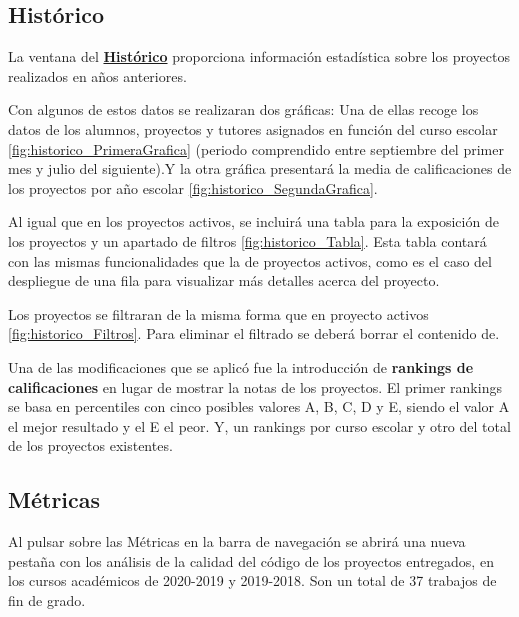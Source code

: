 \subsection{Histórico} 
La ventana del \textbf{\href{https://gestor-tfg-2021.herokuapp.com/Historic}{Histórico}} proporciona información estadística sobre los proyectos realizados en años anteriores. 

Con algunos de estos datos se realizaran dos gráficas: Una de ellas recoge los datos de los alumnos, proyectos y tutores asignados en función del curso escolar \ref{fig:historico_PrimeraGrafica} (periodo comprendido entre septiembre del primer mes y julio del siguiente).Y la otra gráfica presentará la media de calificaciones de los proyectos por año escolar \ref{fig:historico_SegundaGrafica}.



Al igual que en los proyectos activos, se incluirá una tabla para la exposición de los proyectos y un apartado de filtros \ref{fig:historico_Tabla}. Esta tabla contará con las mismas funcionalidades que la de proyectos activos, como es el caso del despliegue de una fila para visualizar más detalles acerca del proyecto. 

Los proyectos se filtraran de la misma forma que en proyecto activos \ref{fig:historico_Filtros}. Para eliminar el filtrado se deberá borrar el contenido de.

Una de las modificaciones que se aplicó fue la introducción de \textbf{rankings de calificaciones} en lugar de mostrar la notas de los proyectos. El primer rankings se basa en percentiles con cinco posibles valores A, B, C, D y E, siendo el valor A el mejor resultado y el E el peor. Y, un rankings por curso escolar y otro del total de los proyectos existentes.



\subsection{Métricas} 
Al pulsar sobre las Métricas en la barra de navegación se abrirá una nueva pestaña con los análisis de la calidad del código de los proyectos entregados, en los cursos académicos de 2020-2019 y 2019-2018. Son un total de 37 trabajos de fin de grado.

